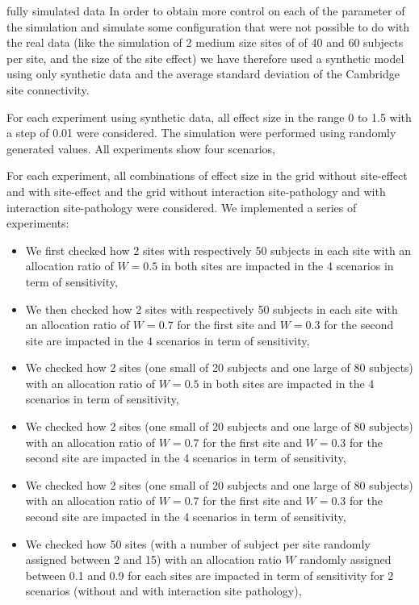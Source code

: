 \documentclass[authoryear]{elsarticle}
\begin{document}
fully simulated data
In order to obtain more control on each of the parameter of the simulation and simulate some configuration that were not possible to do with the real data (like the simulation of 2 medium size sites of of 40 and 60 subjects per site, and the size of the site effect) we have therefore used a synthetic model using only synthetic data and the average standard deviation of the Cambridge site connectivity.

For each experiment using synthetic data, all effect size in the range 0 to 1.5 with a step of 0.01 were considered. The simulation were performed using randomly generated values. All experiments show four scenarios,  

For each experiment, all combinations of effect size in
the grid {without site-effect and with site-effect} and the grid {without interaction site-pathology and with interaction site-pathology} were considered. We implemented a series of experiments:

\begin{itemize}
  \item We first checked how 2 sites with respectively 50 subjects in each site with an allocation ratio of $W=0.5$ in both sites are impacted in the 4 scenarios in term of sensitivity,
  \item We then checked how 2 sites with respectively 50 subjects in each site with an allocation ratio of $W=0.7$ for the first site and $W=0.3$ for the second site are impacted in the 4 scenarios in term of sensitivity,
  \item We checked how 2 sites (one small of 20 subjects and one large of 80 subjects) with an allocation ratio of $W=0.5$ in both sites are impacted in the 4 scenarios in term of sensitivity,
  \item We checked how 2 sites (one small of 20 subjects and one large of 80 subjects) with an allocation ratio of $W=0.7$ for the first site and $W=0.3$ for the second site are impacted in the 4 scenarios in term of sensitivity,
   \item We checked how 2 sites (one small of 20 subjects and one large of 80 subjects) with an allocation ratio of $W=0.7$ for the first site and $W=0.3$ for the second site are impacted in the 4 scenarios in term of sensitivity,
   \item We checked how 50 sites (with a number of subject per site randomly assigned between 2 and 15) with an allocation ratio $W$ randomly assigned between 0.1 and 0.9 for each sites are impacted in term of sensitivity for 2 scenarios (without and with interaction site pathology),
\end{itemize}
 
\end{document}
